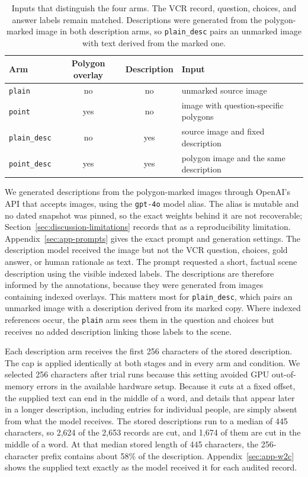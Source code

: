 \begin{table}[ht]
\centering
\caption[Four input arms]{Inputs that distinguish the four arms. The VCR
record, question, choices, and answer labels remain matched. Descriptions were
generated from the \mbox{polygon-marked} image in both description arms, so
\texttt{plain\_desc} pairs an unmarked image with text derived from the marked
one.}
\label{tab:setup-arms}
\begin{tabular}{lccL{6.0cm}}
\toprule
Arm & Polygon overlay & Description & Input \\
\midrule
\texttt{plain} & no & no & unmarked source image \\
\texttt{point} & yes & no & image with question-specific polygons \\
\texttt{plain\_desc} & no & yes & source image and fixed description \\
\texttt{point\_desc} & yes & yes & polygon image and the same description \\
\bottomrule
\end{tabular}
\end{table}

We generated descriptions from the polygon-marked images through
\mbox{OpenAI's} API that accepts images, using the \texttt{gpt-4o} model alias. The alias is mutable
and no dated snapshot was pinned, so the exact weights behind it are not
recoverable; Section~\ref{sec:discussion-limitations} records that as a
reproducibility limitation. Appendix~\ref{sec:app-prompts} gives the exact prompt and
generation settings. The description model received the image but not the VCR question, choices,
gold answer, or human rationale as text. The prompt requested a short, factual
scene description using the visible indexed labels. The descriptions are
therefore informed by the annotations, because they were generated from images
containing indexed overlays. This matters most for \texttt{plain\_desc}, which
pairs an unmarked image with a description derived from its marked copy. Where
indexed references occur, the \texttt{plain} arm sees them in the question and
choices but receives no added description linking those labels to the scene.

Each description arm receives the first 256 characters of the stored
description. The cap is applied identically at both stages and in every arm and
condition. We selected 256 characters after trial runs because this setting
avoided GPU out-of-memory errors in the available hardware setup. Because it cuts
at a fixed offset, the supplied text can end in the middle of a word, and
details that appear later in a longer description, including entries for
individual people,
are simply absent from what the model receives. The stored descriptions run to a
median of 445 characters, so 2,624 of the 2,653 records are cut, and 1,674 of them
are cut in the middle of a word. At that
median stored length of 445 characters, the 256-character prefix contains about
58\% of the description.
Appendix~\ref{sec:app-w2c} shows the supplied text exactly as the model
received it for each audited record.

